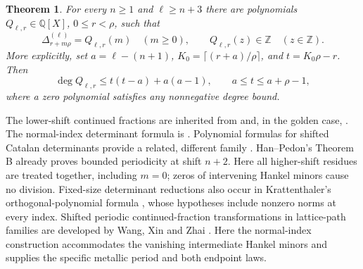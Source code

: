 \documentclass[11pt,a4paper]{article}
\newcommand{\Z}{\mathbb Z}
\newcommand{\Q}{\mathbb Q}
\newcommand{\D}[2]{\Delta_{#1}^{(#2)}}
\newtheorem{theorem}{Theorem}
\begin{document}
\begin{theorem}\label{main}
For every $n\ge1$ and $\ell\ge n+3$ there are polynomials
$Q_{\ell,r}\in\Q[X]$, $0\le r<\rho$, such that
\[
 \D{r+m\rho}\ell=Q_{\ell,r}(m)\quad(m\ge0),\qquad
 Q_{\ell,r}(z)\in\Z\quad(z\in\Z).
\]
More explicitly, set $a=\ell-(n+1)$,
$K_0=\lceil(r+a)/\rho\rceil$, and $t=K_0\rho-r$. Then
\begin{equation}\label{degree}
 \deg Q_{\ell,r}\le t(t-a)+a(a-1),\qquad a\le t\le a+\rho-1,
\end{equation}
where a zero polynomial satisfies any nonnegative degree bound.
\end{theorem}

The lower-shift continued fractions are inherited from
\cite[Theorem~7.3]{HP} and, in the golden case, \cite[\S3.3]{OP}.
The normal-index determinant formula is \cite[Theorem~2.1]{Han}.
Polynomial formulas for shifted Catalan determinants provide a related,
different family \cite[\S1]{Cigler}. Han--Pedon's Theorem B
\cite[p.~5]{HPplus} already proves bounded periodicity at shift $n+2$.
Here all higher-shift residues are treated together,
including $m=0$; zeros of intervening Hankel minors cause no division.
Fixed-size determinant reductions also occur in Krattenthaler's
orthogonal-polynomial formula \cite[Theorem~1]{Kratt}, whose hypotheses
include nonzero norms at every index. Shifted periodic continued-fraction
transformations in lattice-path families are developed by Wang, Xin and
Zhai \cite{WXZ}. Here the normal-index construction accommodates the
vanishing intermediate Hankel minors and supplies the specific metallic
period and both endpoint laws.
\end{document}

